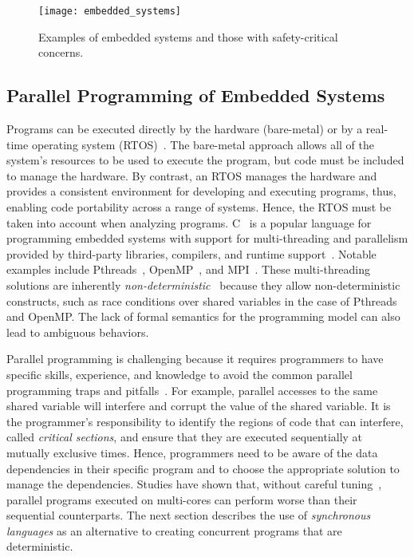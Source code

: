 \begin{figure}
	\centering
	\texttt{[image: embedded\_systems]}

	\caption{Examples of embedded systems and those with safety-critical concerns.}
	\label{fig:introduction:embedded_systems}
\end{figure}

\subsection{Parallel Programming of Embedded Systems}
\label{sec:introduction:programming}
Programs can be
executed directly by the hardware (bare-metal) or by a
real-time operating system (RTOS)~\cite{pret_merasa_rtos}. 
The bare-metal approach allows all of the system's resources to be used
to execute the program, but code must be included 
to manage the hardware. By contrast, an
RTOS manages the hardware and provides a
consistent environment for developing and executing
programs, thus, enabling code portability across a range of
systems. Hence, the RTOS must be taken into account when analyzing programs. 
C~\cite{programming_languages_c11} is a popular language for 
programming embedded systems with 
support for multi-threading and parallelism 
provided by third-party libraries, compilers, and 
runtime support~\cite{DiazMN12}. Notable 
examples include Pthreads~\cite{multiprocessor_pthreads},
OpenMP~\cite{multiprocessor_openmp}, and
MPI~\cite{multiprocessor_mpi}. 
These multi-threading solutions are inherently
\emph{non-deterministic}~\cite{multiprocessing_problem_threads}
because they allow non-deterministic constructs,
such as race conditions over shared variables in
the case of Pthreads and OpenMP.
The lack of formal semantics for the programming model 
can also lead to ambiguous behaviors. 

Parallel programming is challenging because it requires 
programmers to have specific skills, experience, and 
knowledge to avoid the common parallel programming traps and 
pitfalls~\cite{multiprocessing_debugging_concurrency}. 
For example, parallel accesses to the same shared 
variable will interfere and corrupt the value of the shared variable. 
It is the programmer's responsibility to identify
the regions of code that can interfere, called \emph{critical sections}, 
and ensure that they are executed sequentially at
mutually exclusive times. Hence, programmers need to be 
aware of the data dependencies in their specific program 
and to choose the appropriate solution to manage the dependencies. 
Studies have shown that, without careful tuning~\cite{multithreading_multicore_issues}, 
parallel programs executed on multi-cores can perform 
worse than their sequential counterparts.
The next section describes the use of \emph{synchronous 
languages} as an alternative to creating concurrent programs 
that are deterministic.

